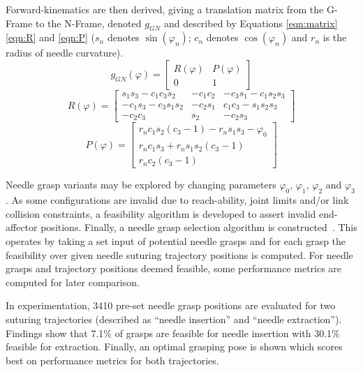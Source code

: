 \documentclass[english]{sobraep}
\begin{document}
\par{Forward-kinematics are then derived, giving a translation matrix from the G-Frame to the N-Frame, denoted $g_{GN}$ and described by Equations \ref{eqn:matrix} \ref{eqn:R} and \ref{eqn:P} ($s_n$ denotes $\sin(\varphi_n)$; $c_n$ denotes $\cos(\varphi_n)$ and $r_n$ is the radius of needle curvature).}
\begin{equation}
    g_{GN}(\varphi) = 
      \begin{bmatrix}
      R(\varphi) & P(\varphi)\\
      0 & 1
      \end{bmatrix}
      \label{eqn:matrix}
\end{equation}
\begin{equation}
    R(\varphi) =  
    \begin{bmatrix}
    s_1 s_3 - c_1 c_3 s_2 & - c_1 c_2 & - c_3 s_1 - c_1 s_2 s_3 \\
    -c_1 s_3 - c_3 s_1 s_2 & - c_2 s_1 & c_1 c_3 - s_1 s_2 s_3 \\
    -c_2 c_3 & s_2 & -c_2 s_3
    \end{bmatrix}
    \label{eqn:R}
\end{equation}
\begin{equation}
    P(\varphi) = 
    \begin{bmatrix}
    r_n c_1 s_2 (c_3 - 1)-r_n s_1 s_3 - \varphi_0\\
    r_n c_1 s_3 + r_n s_1 s_2 (c_3 - 1)\\
    r_n c_2 (c_3 - 1)
    \end{bmatrix}
    \label{eqn:P}
\end{equation}

Needle grasp variants may be explored by changing parameters $\varphi_0$, $\varphi_1$, $\varphi_2$ and $\varphi_3$. As some configurations are invalid due to reach-ability, joint limits and/or link collision constraints, a feasibility algorithm is developed to assert invalid end-affector positions. Finally, a needle grasp selection algorithm is constructed~\cite[Algorithm 1]{needle-grasp}. This operates by taking a set input of potential needle grasps and for each grasp the feasibility over given needle suturing trajectory positions is computed. For needle grasps and trajectory positions deemed feasible, some performance metrics are computed for later comparison.

In experimentation, 3410 pre-set needle grasp positions are evaluated for two suturing trajectories (described as ``needle insertion'' and ``needle extraction''). Findings show that 7.1\% of grasps are feasible for needle insertion with 30.1\% feasible for extraction. Finally, an optimal grasping pose is shown which scores best on performance metrics for both trajectories. 
\end{document}

